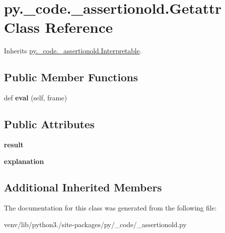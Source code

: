\hypertarget{classpy_1_1__code_1_1__assertionold_1_1_getattr}{}\section{py.\+\_\+code.\+\_\+assertionold.\+Getattr Class Reference}
\label{classpy_1_1__code_1_1__assertionold_1_1_getattr}


Inherits \hyperlink{classpy_1_1__code_1_1__assertionold_1_1_interpretable}{py.\+\_\+code.\+\_\+assertionold.\+Interpretable}.

\subsection*{Public Member Functions}
\begin{DoxyCompactItemize}
\item 
\mbox{\label{classpy_1_1__code_1_1__assertionold_1_1_getattr_a5d568dfbcf9e034302ff65d46927e0b8}} 
def {\bfseries eval} (self, frame)
\end{DoxyCompactItemize}
\subsection*{Public Attributes}
\begin{DoxyCompactItemize}
\item 
\mbox{\label{classpy_1_1__code_1_1__assertionold_1_1_getattr_a3ca8ef488517a83d486adb986917a40a}} 
{\bfseries result}
\item 
\mbox{\label{classpy_1_1__code_1_1__assertionold_1_1_getattr_a0de808b2bcb9e5cf1240eba104042c8e}} 
{\bfseries explanation}
\end{DoxyCompactItemize}
\subsection*{Additional Inherited Members}


The documentation for this class was generated from the following file\+:\begin{DoxyCompactItemize}
\item 
venv/lib/python3./site-\/packages/py/\+\_\+code/\+\_\+assertionold.\+py\end{DoxyCompactItemize}
